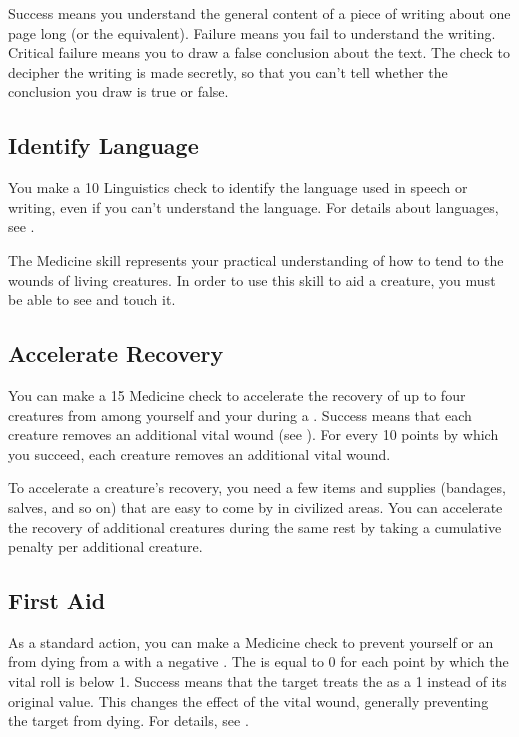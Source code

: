         Success means you understand the general content of a piece of writing about one page long (or the equivalent). Failure means you fail to understand the writing. Critical failure means you to draw a false conclusion about the text. The check to decipher the writing is made secretly, so that you can't tell whether the conclusion you draw is true or false.

    \subsection{Identify Language}
        You make a  10 Linguistics check to identify the language used in speech or writing, even if you can't understand the language.
        For details about languages, see .

\newpage
{}
    The Medicine skill represents your practical understanding of how to tend to the wounds of living creatures.
    In order to use this skill to aid a creature, you must be able to see and touch it.

    \subsection{Accelerate Recovery}\label{Accelerate Recovery}
        You can make a  15 Medicine check to accelerate the recovery of up to four creatures from among yourself and your  during a .
        Success means that each creature removes an additional vital wound (see ).
        For every 10 points by which you succeed, each creature removes an additional vital wound.

        To accelerate a creature's recovery, you need a few items and supplies (bandages, salves, and so on) that are easy to come by in civilized areas.
        You can accelerate the recovery of additional creatures during the same rest by taking a cumulative  penalty per additional creature.

    \subsection{First Aid}\label{First Aid}
        As a standard action, you can make a Medicine check to prevent yourself or an  from dying from a  with a negative .
        The  is equal to 0  for each point by which the vital roll is below 1.
        Success means that the target treats the  as a 1 instead of its original value.
        This changes the effect of the vital wound, generally preventing the target from dying.
        For details, see .

